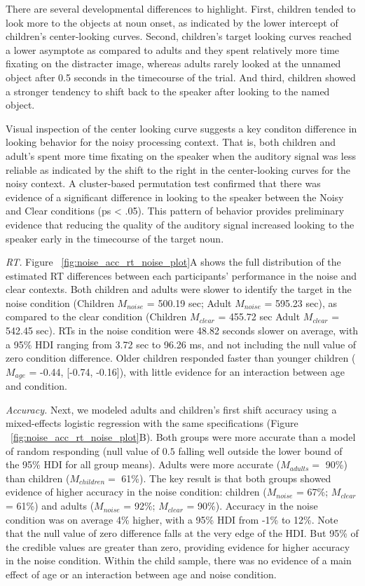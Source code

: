 \documentclass[english,floatsintext,man]{apa6}
\begin{document}
There are several developmental differences to highlight. First,
children tended to look more to the objects at noun onset, as indicated
by the lower intercept of children's center-looking curves. Second,
children's target looking curves reached a lower asymptote as compared
to adults and they spent relatively more time fixating on the distracter
image, whereas adults rarely looked at the unnamed object after 0.5
seconds in the timecourse of the trial. And third, children showed a
stronger tendency to shift back to the speaker after looking to the
named object.

Visual inspection of the center looking curve suggests a key conditon
difference in looking behavior for the noisy processing context. That
is, both children and adult's spent more time fixating on the speaker
when the auditory signal was less reliable as indicated by the shift to
the right in the center-looking curves for the noisy context. A
cluster-based permutation test confirmed that there was evidence of a
significant difference in looking to the speaker between the Noisy and
Clear conditions (ps \textless{} .05). This pattern of behavior provides
preliminary evidence that reducing the quality of the auditory signal
increased looking to the speaker early in the timecourse of the target
noun.

\emph{RT.} Figure ~\ref{fig:noise_acc_rt_noise_plot}A shows the full
distribution of the estimated RT differences between each participants'
performance in the noise and clear contexts. Both children and adults
were slower to identify the target in the noise condition (Children
\(M_{noise}\) = 500.19 sec; Adult \(M_{noise}\) = 595.23 sec), as
compared to the clear condition (Children \(M_{clear}\) = 455.72 sec
Adult \(M_{clear}\) = 542.45 sec). RTs in the noise condition were 48.82
seconds slower on average, with a 95\% HDI ranging from 3.72 sec to
96.26 ms, and not including the null value of zero condition difference.
Older children responded faster than younger children (\(M_{age}\) =
-0.44, {[}-0.74, -0.16{]}), with little evidence for an interaction
between age and condition.

\emph{Accuracy.} Next, we modeled adults and children's first shift
accuracy using a mixed-effects logistic regression with the same
specifications (Figure ~\ref{fig:noise_acc_rt_noise_plot}B). Both groups
were more accurate than a model of random responding (null value of
\(0.5\) falling well outside the lower bound of the 95\% HDI for all
group means). Adults were more accurate (\(M_{adults} =\) 90\%) than
children (\(M_{children} =\) 61\%). The key result is that both groups
showed evidence of higher accuracy in the noise condition: children
(\(M_{noise}\) = 67\%; \(M_{clear}\) = 61\%) and adults (\(M_{noise}\) =
92\%; \(M_{clear}\) = 90\%). Accuracy in the noise condition was on
average 4\% higher, with a 95\% HDI from -1\% to 12\%. Note that the
null value of zero difference falls at the very edge of the HDI. But
95\% of the credible values are greater than zero, providing evidence
for higher accuracy in the noise condition. Within the child sample,
there was no evidence of a main effect of age or an interaction between
age and noise condition.
\end{document}
